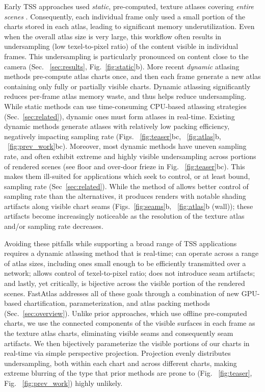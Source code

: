 Early TSS approaches used {\em static}, pre-computed, texture atlases covering {\em entire scenes} \cite{baker:2016, hillesland2016texel,Baker2022}. Consequently, each individual frame only used a small portion of the charts stored in each atlas, leading to significant memory underutilization. Even when the overall atlas size is very large, this workflow often results in undersampling (low texel-to-pixel ratio) of the content visible in individual frames. This undersampling is particularly pronounced on content close to the camera \cite{Neff2022MSA,Karis:NaniteTalk} (Sec. ~\ref{sec:results}, Fig.~\ref{fig:static}b).
More recent {\em dynamic} atlasing methods \cite{mueller2018shading,hladky2019tessellated,hladky2021snakebinning,Neff2022MSA} pre-compute atlas charts once, and then each frame generate a new atlas containing only fully or partially visible charts. Dynamic atlassing significantly reduces per-frame atlas memory waste, and thus helps reduce undersampling. 
While static methods can use time-consuming CPU-based atlassing strategies (Sec.~\ref{sec:related}), dynamic ones must form atlases in real-time. Existing dynamic methods generate atlases with relatively low packing efficiency, negatively impacting sampling rate (Figs. ~\ref{fig:teaser}bc, ~\ref{fig:atlas}b, ~\ref{fig:prev_work}bc). Moreover, most dynamic methods have uneven sampling rate, and often exhibit extreme and highly visible undersampling across portions of rendered scenes (see floor and over-door frieze in Fig. ~\ref{fig:teaser}bc). This makes them ill-suited for applications which seek to control, or at least bound, sampling rate (Sec~\ref{sec:related}).
While the method of \cite{Neff2022MSA} allows better control of sampling rate than the alternatives, it produces renders with notable shading artifacts along visible chart seams (Figs.~\ref{fig:seams}b, ~\ref{fig:atlas}b (wall)); these artifacts become increasingly noticeable as the resolution of the texture atlas and/or sampling rate decreases. 

Avoiding these pitfalls while supporting a broad range of TSS applications requires a dynamic atlassing method that is real-time; can operate across a range of atlas sizes, including ones small enough to be efficiently transmitted over a network; allows control of texel-to-pixel ratio; does not introduce seam artifacts; and lastly, yet critically, is bijective across the visible portion of the rendered scenes. FastAtlas addresses all of these goals through a combination of new GPU-based chartification, parameterization, and atlas packing methods (Sec.~\ref{sec:overview}). Unlike prior approaches, which use offline pre-computed charts, we use the connected components of the visible surfaces in each frame as the texture atlas charts, eliminating visible seams and consequently seam artifacts. We then bijectively parameterize the visible portions of our charts in real-time via simple perspective projection. Projection evenly distributes undersampling, both within each chart and across different charts, making extreme blurring of the type that prior methods are prone to (Fig. ~\ref{fig:teaser}, Fig. ~\ref{fig:prev_work}) highly unlikely. 

